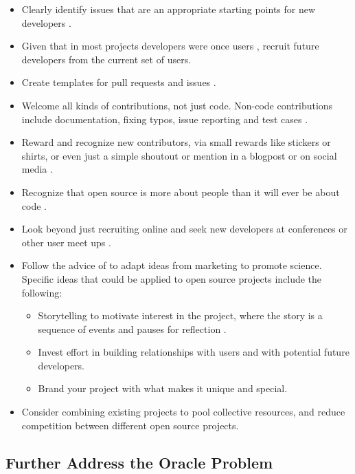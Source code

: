 \documentclass[final, 3p, times, authoryear]{elsarticle}
\begin{document}
\begin{itemize}
	\item Clearly identify issues that are an appropriate starting points for
	new developers \citep{Garcia2016, Jalan2016, Proffitt2017}.
	\item Given that in most projects developers were once users
	\citep{McQuaid2018}, recruit future developers from the current set of
	users.
	\item Create templates for pull requests and issues \citep{Jalan2016}.
    \item Welcome all kinds of contributions, not just code.  Non-code
    contributions include documentation, fixing typos, issue reporting and test
    cases \citep{Jalan2016, Proffitt2017}.
    \item Reward and recognize new contributors, via small rewards like stickers
    or shirts, or even just a simple shoutout or mention in a blogpost or on
    social media \citep{Jalan2016, Proffitt2017}.
    \item Recognize that open source is more about people than it will ever be
    about code \citep{Jalan2016}.
    \item Look beyond just recruiting online and seek new developers at
    conferences or other user meet ups \citep{Garcia2016}.
    \item Follow the advice of \citet{Kuchner2012} to adapt ideas from marketing
    to promote science.  Specific ideas that could be applied to open source
    projects include the following: 
    \begin{itemize}
		\item Storytelling to motivate interest in the project, where the story
		is a sequence of events and pauses for reflection \citep[p.\
		21--22]{Kuchner2012}.
		\item Invest effort in building relationships with users and with potential future developers.
		\item Brand your project with what makes it unique and special.
	\end{itemize}
	\item Consider combining existing projects to pool collective resources, and
	reduce competition between different open source projects.
\end{itemize}

\subsection{Further Address the Oracle Problem} \label{Sec_FurtherOracle}
\end{document}
